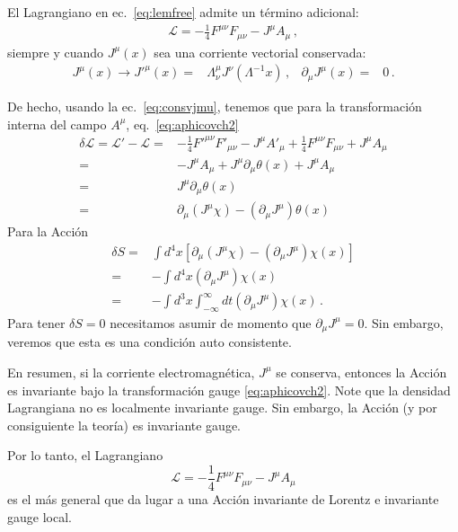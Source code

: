 El Lagrangiano en ec.~\eqref{eq:lemfree} admite un término adicional:
\begin{align}
    \mathcal{L}=-\frac{1}{4}F^{\mu\nu}F_{\mu\nu}-J^\mu A_\mu\,,
\end{align}
siempre y cuando $J^\mu(x)$ sea una corriente vectorial conservada:
\begin{align}
J^\mu(x)\to  {J'}^\mu(x)=&\Lambda^\mu_\nu J^\nu(\Lambda^{-1}x)\,,&  \partial_\mu J^\mu(x)=&0\,.
\end{align}

De hecho,  usando la ec.~\eqref{eq:consvjmu}, tenemos que para la transformación interna del campo $A^\mu$, eq.~\eqref{eq:aphicovch2}
\begin{align}
  \delta\mathcal{L}=\mathcal{L}'-\mathcal{L}=&
-\frac{1}{4}{F'}^{\mu\nu}F'_{\mu\nu}-J^\mu A'_\mu+\frac{1}{4}F^{\mu\nu}F_{\mu\nu}+J^\mu A_\mu\nonumber\\
  =&-J^\mu A_\mu+J^\mu\partial_\mu\theta(x)+J^\mu A_\mu\nonumber\\
  =&J^\mu\partial_\mu\theta(x)\nonumber\\
=&\partial_\mu(J^\mu\chi)-(\partial_\mu J^\mu)\theta(x)
\end{align}
Para la Acción
\begin{align}
  \delta S=&\int d^4x \left[\partial_\mu(J^\mu\chi)-(\partial_\mu J^\mu)\chi(x)\right]\nonumber\\
=&-\int d^4x (\partial_\mu J^\mu)\chi(x)\nonumber\\
=&-\int d^3x\int_{-\infty}^\infty dt (\partial_\mu J^\mu)\chi(x)\,.
\end{align}
Para tener $\delta S=0$ necesitamos asumir de momento que
$\partial_\mu J^\mu=0$. Sin embargo, veremos que esta es una condición
auto consistente.


En resumen, si la corriente electromagnética, $J^\mu$ se conserva, entonces la Acción es invariante bajo la transformación gauge \eqref{eq:aphicovch2}. Note que la densidad Lagrangiana no es localmente invariante gauge. Sin embargo, la Acción (y por consiguiente la teoría) es invariante gauge.


\begin{frame}
Por lo tanto, el Lagrangiano
\begin{equation}
  \label{eq:lagAmum}
  \mathcal{L}=-\frac{1}{4}F^{\mu\nu}F_{\mu\nu}-J^\mu A_\mu
\end{equation}
es el más general que da lugar a una Acción invariante de Lorentz e invariante gauge
local. 

\end{frame}

